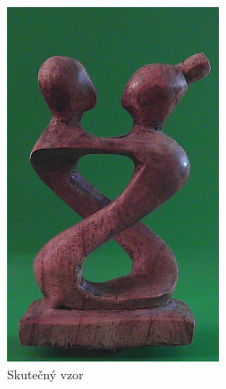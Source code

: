 \documentclass[12pt]{report}			%
\begin{document}
              \begin{figure}[h]
                    \centering
                    \begin{subfigure}[b]{0.3\textwidth}
                     \centering
                     \includegraphics[width=\textwidth]{images/skutecnyPredmet.png}
                     \caption{Skutečný vzor}
                    \end{subfigure}
                    \hfill
                    \begin{subfigure}[b]{0.3\textwidth}
                     \centering

\end{subfigure}
\end{figure}
\end{document}
